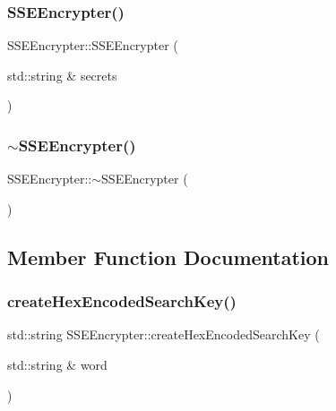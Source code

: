 \subsubsection{\texorpdfstring{S\+S\+E\+Encrypter()}{SSEEncrypter()}\hspace{0.1cm}{\footnotesize\ttfamily [2/2]}}
{\footnotesize\ttfamily S\+S\+E\+Encrypter\+::\+S\+S\+E\+Encrypter (\begin{DoxyParamCaption}\item[{std\+::string \&}]{secrets }\end{DoxyParamCaption})}

\mbox{\label{classSSEEncrypter_a249d1527f2d370c693534c3d435a522a}} 
\subsubsection{\texorpdfstring{$\sim$\+S\+S\+E\+Encrypter()}{~SSEEncrypter()}}
{\footnotesize\ttfamily S\+S\+E\+Encrypter\+::$\sim$\+S\+S\+E\+Encrypter (\begin{DoxyParamCaption}{ }\end{DoxyParamCaption})\hspace{0.3cm}{\ttfamily [virtual]}}



\subsection{Member Function Documentation}
\mbox{\label{classSSEEncrypter_a09dac9d519550e0375f0f677aab69bfb}} 
\subsubsection{\texorpdfstring{create\+Hex\+Encoded\+Search\+Key()}{createHexEncodedSearchKey()}}
{\footnotesize\ttfamily std\+::string S\+S\+E\+Encrypter\+::create\+Hex\+Encoded\+Search\+Key (\begin{DoxyParamCaption}\item[{std\+::string \&}]{word }\end{DoxyParamCaption})}

